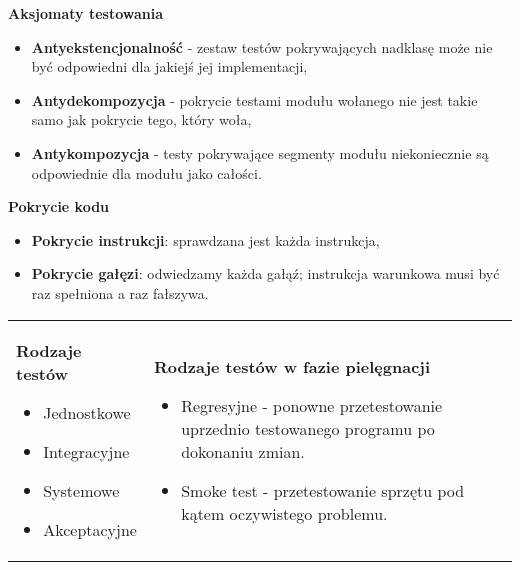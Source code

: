\documentclass[a4paper]{article}
\begin{document}
    \textbf{Aksjomaty testowania}
    \begin{itemize}
        \item \textbf{Antyekstencjonalność} - zestaw testów pokrywających nadklasę może nie być odpowiedni
        dla jakiejś jej implementacji,
        \item \textbf{Antydekompozycja} - pokrycie testami modułu wołanego nie jest takie samo
        jak pokrycie tego, który woła,
        \item \textbf{Antykompozycja} - testy pokrywające segmenty modułu niekoniecznie są odpowiednie
        dla modułu jako całości.
    \end{itemize}


    \textbf{Pokrycie kodu}
    \begin{itemize}
        \item \textbf{Pokrycie instrukcji}: sprawdzana jest każda instrukcja,
        \item \textbf{Pokrycie gałęzi}: odwiedzamy każda gałąź; instrukcja warunkowa musi być raz spełniona a raz fałszywa.
    \end{itemize}


    \begin{table}[H]
        \begin{center}
            \begin{tabular}{ p{} p{} }
                \textbf{Rodzaje testów}
                \begin{itemize}
                    \item Jednostkowe
                    \item Integracyjne
                    \item Systemowe
                    \item Akceptacyjne
                \end{itemize}
                &
                \textbf{Rodzaje testów w fazie pielęgnacji}
                \begin{itemize}
                    \item Regresyjne - ponowne przetestowanie uprzednio testowanego programu po dokonaniu zmian.
                    \item Smoke test - przetestowanie sprzętu pod kątem oczywistego problemu.
                \end{itemize}
            \end{tabular}
        \end{center}
    \end{table}
\end{document}
